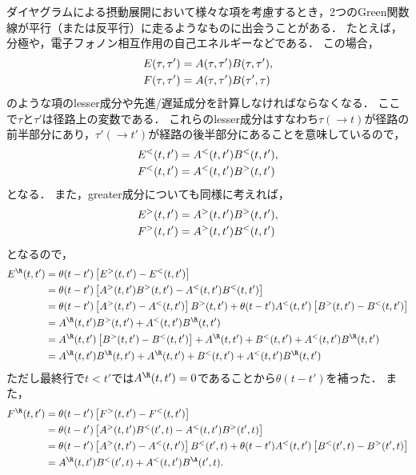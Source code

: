 \documentclass[a4paper,10pt]{jsarticle}
\begin{document}
ダイヤグラムによる摂動展開において様々な項を考慮するとき，2つのGreen関数線が平行（または反平行）に走るようなものに出会うことがある．
たとえば，分極や，電子フォノン相互作用の自己エネルギーなどである．
この場合，
\begin{align}
E (\tau, \tau')
	& = A (\tau, \tau') B (\tau, \tau')
, \notag \\
F (\tau, \tau')
	& = A (\tau, \tau') B (\tau', \tau)
\end{align}
のような項のlesser成分や先進/遅延成分を計算しなければならなくなる．
ここで$\tau$と$\tau'$は径路上の変数である．
これらのlesser成分はすなわち$\tau (\to t)$が径路の前半部分にあり，$\tau' (\to t')$が経路の後半部分にあることを意味しているので，
\begin{align}
E^{<} (t, t')
	& = A^{<} (t, t') B^{<} (t, t')
, \notag \\
F^{<} (t, t')
	& = A^{<} (t, t') B^{>} (t, t')
\end{align}
となる．
また，greater成分についても同様に考えれば，
\begin{align*}
E^{>} (t, t')
	& = A^{>} (t, t') B^{>} (t, t')
, \notag \\
F^{>} (t, t')
	& = A^{>} (t, t') B^{<} (t, t')
\end{align*}
となるので，
\begin{align*}
E^{\R} (t, t')
	& = \theta (t - t') \left[ E^{>} (t, t') - E^{<} (t, t') \right]
\\	& = \theta (t - t') \left[ A^{>} (t, t') B^{>} (t, t') - A^{<} (t, t') B^{<} (t, t') \right]
\\	& = \theta (t - t') \left[ A^{>} (t, t') - A^{<} (t, t') \right] B^{>} (t, t')
		+ \theta (t - t') A^{<} (t, t') \left[ B^{>} (t, t') - B^{<} (t, t') \right]
\\	& = A^{\R} (t, t') B^{>} (t, t') + A^{<} (t, t') B^{\R} (t, t')
\\	& = A^{\R} (t, t') \left[ B^{>} (t, t') - B^{<} (t, t') \right] + A^{\R} (t, t') + B^{<} (t, t') + A^{<} (t, t') B^{\R} (t, t')
\\	& = A^{\R} (t, t') B^{\R} (t, t') + A^{\R} (t, t') + B^{<} (t, t') + A^{<} (t, t') B^{\R} (t, t')
\end{align*}
ただし最終行で$ t < t'$では$A^{\R} (t, t') = 0$であることから$\theta (t - t')$を補った．
また，
\begin{align}
F^{\R} (t, t')
	& = \theta (t - t') \left[ F^{>} (t, t') - F^{<} (t, t') \right]
\notag \\
	& = \theta (t - t') \left[ A^{>} (t, t') B^{<} (t', t) - A^{<} (t, t') B^{>} (t', t) \right]
\notag \\
	& = \theta (t - t') \left[ A^{>} (t, t') - A^{<} (t, t') \right] B^{<} (t', t)
		+ \theta (t - t') A^{<} (t, t') \left[ B^{<} (t', t) - B^{>} (t', t) \right]
\notag \\
	& = A^{\R} (t, t') B^{<} (t', t) + A^{<} (t, t') B^{\A} (t', t)
.\end{align}
\end{document}
